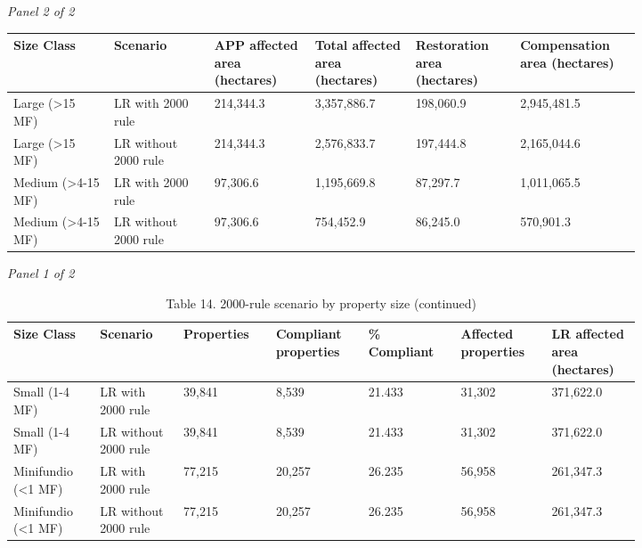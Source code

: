 \documentclass[12pt]{article}
\begin{document}
\begin{landscape}
\begin{table}[H]
\textit{Panel 2 of 2}\\[2pt]
{\fontsize{12}{14}\selectfont
\setlength{\tabcolsep}{3pt}
\renewcommand{\arraystretch}{1.08}
\begin{tabular}{p{0.137\linewidth}p{0.137\linewidth}p{0.137\linewidth}p{0.137\linewidth}p{0.137\linewidth}p{0.137\linewidth}}
\toprule
Size Class & Scenario & APP affected area (hectares) & Total affected area (hectares) & Restoration area (hectares) & Compensation area (hectares) \\
\midrule
Large (>15 MF) & LR with 2000 rule & 214,344.3 & 3,357,886.7 & 198,060.9 & 2,945,481.5 \\
Large (>15 MF) & LR without 2000 rule & 214,344.3 & 2,576,833.7 & 197,444.8 & 2,165,044.6 \\
Medium (>4-15 MF) & LR with 2000 rule & 97,306.6 & 1,195,669.8 & 87,297.7 & 1,011,065.5 \\
Medium (>4-15 MF) & LR without 2000 rule & 97,306.6 & 754,452.9 & 86,245.0 & 570,901.3 \\
\bottomrule
\end{tabular}
}
\end{table}
\begin{table}[H]
\centering
\caption{Table 14. 2000-rule scenario by property size (continued)}
\textit{Panel 1 of 2}\\[2pt]
{\fontsize{12}{14}\selectfont
\setlength{\tabcolsep}{3pt}
\renewcommand{\arraystretch}{1.08}
\begin{tabular}{p{0.117\linewidth}p{0.117\linewidth}p{0.117\linewidth}p{0.117\linewidth}p{0.117\linewidth}p{0.117\linewidth}p{0.117\linewidth}}
\toprule
Size Class & Scenario & Properties & Compliant properties & \% Compliant & Affected properties & LR affected area (hectares) \\
\midrule
Small (1-4 MF) & LR with 2000 rule & 39,841 & 8,539 & 21.433 & 31,302 & 371,622.0 \\
Small (1-4 MF) & LR without 2000 rule & 39,841 & 8,539 & 21.433 & 31,302 & 371,622.0 \\
Minifundio (<1 MF) & LR with 2000 rule & 77,215 & 20,257 & 26.235 & 56,958 & 261,347.3 \\
Minifundio (<1 MF) & LR without 2000 rule & 77,215 & 20,257 & 26.235 & 56,958 & 261,347.3 \\
\bottomrule
\end{tabular}
}

\vspace{0.6em}


\end{table}
\end{landscape}
\end{document}
